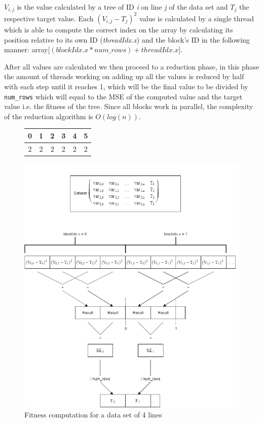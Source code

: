 \documentclass[runningheads]{llncs}
\begin{document}
$V_{i,j}$ is the value calculated by a tree of ID \textit{i} on line \textit{j} of the data set and $T_{j}$ the respective target value. Each $(V_{i,j} - T_{j})^{2}$ value is calculated by a single thread which is able to compute the correct index on the array by calculating its position relative to its own ID (\textit{threadIdx.x}) and the block's ID in the following manner: array[$(blockIdx.x * num\_rows) + threadIdx.x$].

After all values are calculated we then proceed to a reduction phase, in this phase the amount of threads working on adding up all the values is reduced by half with each step until it reaches 1, which will be the final value to be divided by \texttt{num\_rows} which will equal to the MSE of the computed value and the target value i.e. the fitness of the tree. Since all blocks work in parallel, the complexity of the reduction algorithm is $O(log(n))$.

\begin{figure}[!htb]
\begin{center}
 \begin{tabular}{|c|c|c|c|c|c|}
 \hline
 0 & 1 & 2 & 3 & 4 & 5\\
 \hline
 2 & 2 & 2 & 2 & 2 & 2\\
 \hline
\end{tabular}
\end{center}
\end{figure}

\begin{figure}[!htb]
\begin{center}
\includegraphics[scale=0.35]{Fitness_Calculation1}
\end{center}
\caption{Fitness computation for a data set of 4 lines}
\label{fitness_calc}
\end{figure}
\end{document}
